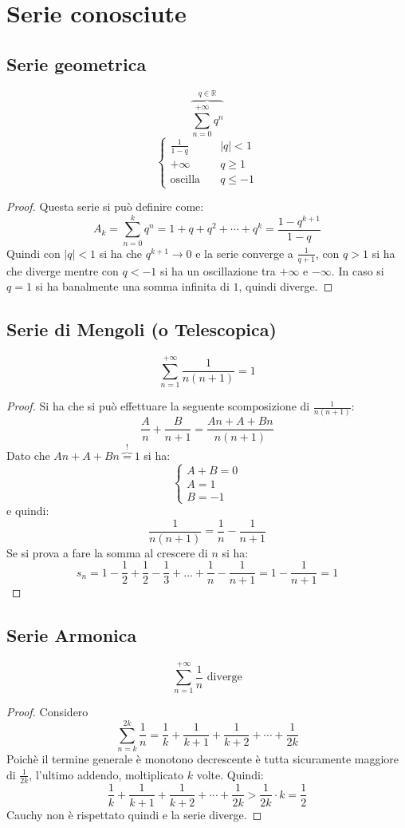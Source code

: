 \documentclass[a4paper,12pt, oneside]{book}
\begin{document}
\section{Serie conosciute}
\subsection{Serie geometrica}
$$\overbrace{\sum_{n=0}^{+\infty} q^{n}}^{q\in \mathbb{R}}$$
$$\left\{
\begin{array}{ll}
	\frac{1}{1-q} & \mbox{ } |q|<1\\
	+\infty & \mbox{ } q\geq 1\\
	\mbox{oscilla } & \mbox{ } q\leq -1
\end{array}
\right.$$
\begin{proof}
Questa serie si può definire come:$$A_k=\sum_{n=0}^{k}q^n=1+q+q^2+\cdots+q^k=\frac{1-q^{k+1}}{1-q}$$
Quindi con $|q|<1$ si ha che $q^{k+1}\rightarrow 0$ e la serie converge a $\frac{1}{q+1}$, con $q>1$ si ha che diverge mentre con $q<-1$ si ha un oscillazione tra $+\infty$ e $-\infty$. In caso si $q=1$ si ha banalmente una somma infinita di $1$, quindi diverge.
\end{proof}
\newpage
\subsection{Serie di Mengoli (o Telescopica)}
$$\sum_{n=1}^{+\infty} \frac{1}{n(n+1)} = 1$$
\begin{proof}
Si ha che si può effettuare la seguente scomposizione di $\frac{1}{n(n+1)}$:
$$\frac{A}{n}+\frac{B}{n+1}=\frac{An+A+Bn}{n(n+1)}$$
Dato che $An+A+Bn \overbrace{=}^{!} 1$ si ha:
				$$\left\{
                \begin{array}{ll}
                  A+B=0\\
                  A=1\\
                  B=-1
				\end{array}
				\right.$$
e quindi: $$\frac{1}{n(n+1)}=\frac{1}{n}-\frac{1}{n+1}$$
Se si prova a fare la somma al crescere di $n$ si ha:$$s_n=1-\frac{1}{2}+\frac{1}{2}-\frac{1}{3}+...+\frac{1}{n}-\frac{1}{n+1}=1-\frac{1}{n+1}=1$$
\end{proof} 
\subsection{Serie Armonica}
$$\sum_{n=1}^{+\infty} \frac{1}{n} \mbox{ diverge}$$
\begin{proof}
Considero $$\sum_{n=k}^{2k}\frac{1}{n}=\frac{1}{k}+\frac{1}{k+1}+\frac{1}{k+2}+\cdots+\frac{1}{2k}$$
Poichè il termine generale è monotono decrescente è tutta sicuramente maggiore di $\frac{1}{2k}$, l'ultimo addendo, moltiplicato $k$ volte. Quindi:
$$\frac{1}{k}+\frac{1}{k+1}+\frac{1}{k+2}+\cdots+\frac{1}{2k}>\frac{1}{2k}\cdot k=	\frac{1}{2}$$
Cauchy non è rispettato quindi e la serie diverge.
\end{proof}
\end{document}
